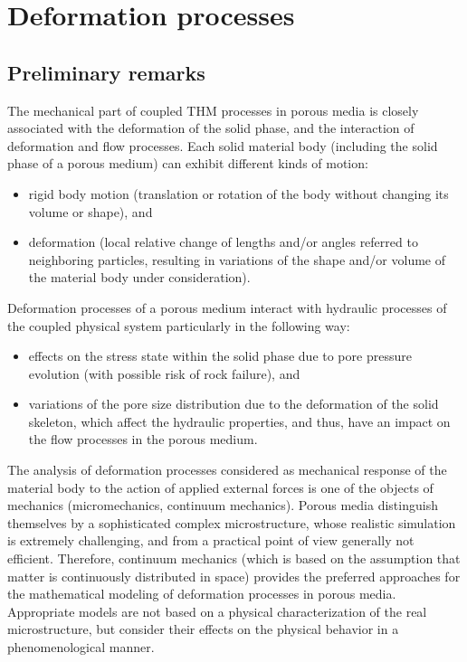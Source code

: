 \newpage
\section{Deformation processes}
\label{sec:def_proc}


\subsection{Preliminary remarks}
\label{sec:prelim}

The mechanical part of coupled THM processes in porous media is closely associated with the deformation of the solid phase, and the interaction of deformation and flow processes. Each solid material body (including the solid phase of a porous medium) can exhibit different kinds of motion:
\begin{itemize}
\item rigid body motion (translation or rotation of the body without changing its volume or shape), and
\item deformation (local relative change of lengths and/or angles referred to neighboring particles, resulting in variations of the shape and/or volume of the material body under consideration).
\end{itemize}
Deformation processes of a porous medium interact with hydraulic processes of the coupled physical system particularly in the following way:
\begin{itemize}
\item effects on the stress state within the solid phase due to pore pressure evolution (with possible risk of rock failure), and
\item variations of the pore size distribution due to the deformation of the solid skeleton, which affect the hydraulic properties, and thus, have an impact on the flow processes in the porous medium.
\end{itemize}

The analysis of deformation processes considered as mechanical response of the material body to the action of applied external forces is one of the objects of mechanics (micromechanics, continuum mechanics). Porous media distinguish themselves by a sophisticated complex microstructure, whose realistic simulation is extremely challenging, and from a practical point of view generally not efficient. Therefore, continuum mechanics (which is based on the assumption that matter is continuously distributed in space) provides the preferred approaches for the mathematical modeling of deformation processes in porous media. Appropriate models are not based on a physical characterization of the real microstructure, but consider their effects on the physical behavior in a phenomenological manner.

